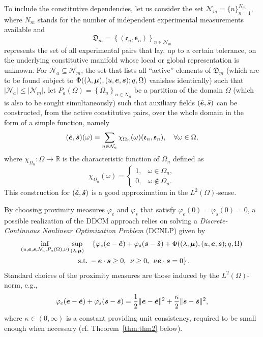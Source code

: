 To include the constitutive dependencies, let us consider the set $\mathcal{N}_m = \lbrace n\rbrace_{n=1}^{N_m}$, where $N_m$ stands for the number of independent experimental measurements available and
%
$$
\mathfrak{D}_m =\left\lbrace\left(\mathfrak{e}_n,\mathfrak{s}_n\right)\right\rbrace_{n\in\mathcal{N}_m}
$$
%
represents the set of all experimental pairs that lay, up to a certain tolerance, on the underlying constitutive manifold whose local or global representation is unknown.
For $\mathcal{N}_a\subseteq\mathcal{N}_m$, the set that lists all ``active'' elements of $\mathfrak{D}_m$ (which are to be found subject to $\Phi((\lF,\mF),(\uF,\eF,\sF);q,\Omega)$ vanishes identically) such that $|\mathcal{N}_a|\leq|\mathcal{N}_m|$, let $ P_a(\Omega) = \left\lbrace\Omega_n\right\rbrace_{n\in \mathcal{N}_a}$ be a partition of the domain $\Omega$ (which is also to be sought simultaneously) such that auxiliary fields $(\eFt,\sFt)$ can be constructed, from the active constitutive pairs, over the whole domain in the form of a simple function, namely
$$
(\eFt,\sFt)(\omega) = \sum_{n\in\mathcal{N}_a}\chi_{\Omega_n}(\omega)(\mathfrak{e}_n,\mathfrak{s}_n), \quad\forall\omega\in\Omega,
$$
where $\chi_{\Omega_n}:\Omega\to\mathbb{R}$ is the characteristic function of $\Omega_n$ defined as
$$
\chi_{\Omega_n}(\omega) = 
\left\lbrace
\begin{array}{rl}
1, & \omega\in\Omega_n,\\
0, & \omega\notin\Omega_n .
\end{array}
\right.
$$
%
This construction for $(\eFt,\sFt)$ is a good approximation in the $L^2(\Omega)$-sense.

By choosing proximity measures $\varphi_e$ and $\varphi_s$ that satisfy $\varphi_e(0) = \varphi_s(0) = 0$, a possible realization of the DDCM approach relies on solving a \textit{Discrete-Continuous Nonlinear Optimization Problem} (DCNLP) given by
%
\begin{multline*}
\inf_{(\uF,\eF,\sF,\mathcal{N}_a,P_a(\Omega),\nF)}\sup_{(\lF,\mF)}\quad\left\lbrace\varphi_e(\eF-\eFt)+\varphi_s(\sF-\sFt)+\Phi((\lF,\mF),(\uF,\eF,\sF);q,\Omega)\right.\\
\left.\:\:\mathrm{s.t.}\:-\eF\cdot\sF\geq 0,\:\:\nF\geq 0,\:\:\nF\eF\cdot\sF = 0\right\rbrace.
\end{multline*}
%
Standard choices of the proximity measures are those induced by the $L^2(\Omega)$-norm, e.g.,
$$
\varphi_e(\eF-\eFt)+\varphi_s(\sF-\sFt) = \frac12\norm[]{\eF-\eFt}^2+\frac{\kappa}{2}\norm[]{\sF-\sFt}^2,
$$
where $\kappa \in (0,\infty)$ is a constant providing unit consistency, required to be small enough when necessary (cf. Theorem~\ref{thm:thm2} below).

